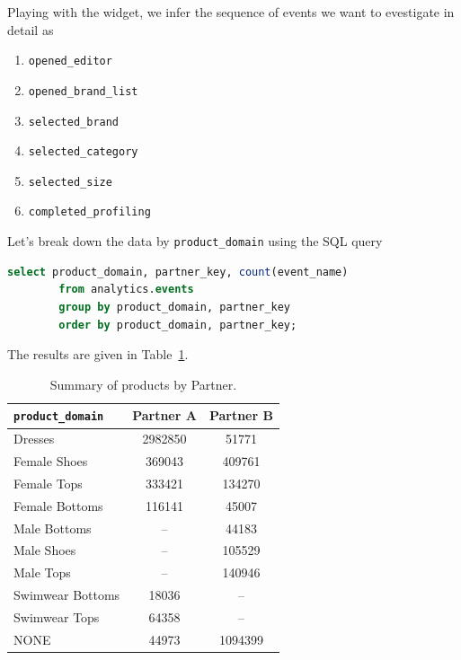 \documentclass[12pt,a4paper]{article}
\begin{document}
    
    Playing with the widget, we infer the sequence of events
    we want to evestigate in detail as
    {
    
        \small
        \begin{enumerate}[itemsep=-1ex]
            \item \verb|opened_editor|
            \item \verb|opened_brand_list|
            \item \verb|selected_brand|
            \item \verb|selected_category|
            \item \verb|selected_size|
            \item \verb|completed_profiling|
        \end{enumerate}
    }

    
    Let's break down the data 
    by \texttt{product\_domain}
    using the SQL query
    \begin{lstlisting}[language=SQL]
        select product_domain, partner_key, count(event_name)
        from analytics.events
        group by product_domain, partner_key 
        order by product_domain, partner_key;
    \end{lstlisting}
    
    
    The results are given in Table~\ref{t:pd_by_pk}.
    \begin{table}[p]
        \begin{center}
            \begin{tabular}{l|cc}
                \texttt{product\_domain} & {Partner A} & {Partner B} \\
                \hline
                Dresses          & 2982850   & 51771     \\
                Female Shoes     & 369043    & 409761    \\
                Female Tops      & 333421    & 134270    \\
                Female Bottoms   & 116141    & 45007     \\
                \hline
                Male Bottoms     & --        & 44183     \\
                Male Shoes       & --        & 105529    \\
                Male Tops        & --        & 140946    \\
                \hline
                Swimwear Bottoms & 18036     & --        \\
                Swimwear Tops    & 64358     & --        \\
                \hline
                NONE             & 44973     & 1094399  
            \end{tabular}
        \end{center}
        \caption{Summary of products by Partner.}
        \label{t:pd_by_pk}
    \end{table}
    
\end{document}
